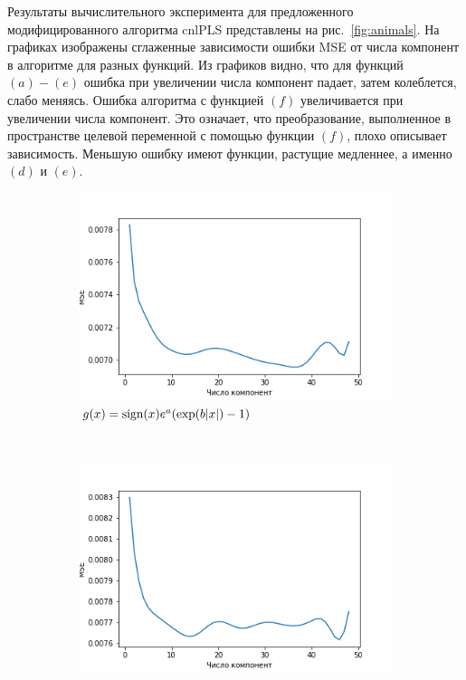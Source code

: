 \documentclass[12pt,fleqn,unicode]{article}
\begin{document}
Результаты вычислительного эксперимента для предложенного модифицированного алгоритма cnlPLS представлены на рис.~\ref{fig:animals}. На графиках изображены сглаженные зависимости ошибки MSE от числа компонент в алгоритме для разных функций. Из графиков видно, что для функций $(a)-(e)$ ошибка при увеличении числа компонент падает, затем колеблется, слабо меняясь. Ошибка алгоритма с функцией $(f)$ увеличивается при увеличении числа компонент. Это означает, что преобразование, выполненное в пространстве целевой переменной с помощью функции $(f)$, плохо описывает зависимость. Меньшую ошибку имеют функции, растущие медленнее, а именно $(d)$ и $(e)$. 

\begin{figure}
    \centering
    \begin{subfigure}[b]{0.4\textwidth}
        \includegraphics[width=\textwidth]{exp_abs_x.png}
        \caption{$g(x) = \mathop{\rm sign}\limits(x) e^a(\exp(b|x|) - 1)$}
        \label{fig:exp_abs_x}
    \end{subfigure}
    ~ %
    \begin{subfigure}[b]{0.4\textwidth}
        \includegraphics[width=\textwidth]{exp_log_x.png}

\end{subfigure}
\end{figure}
\end{document}
